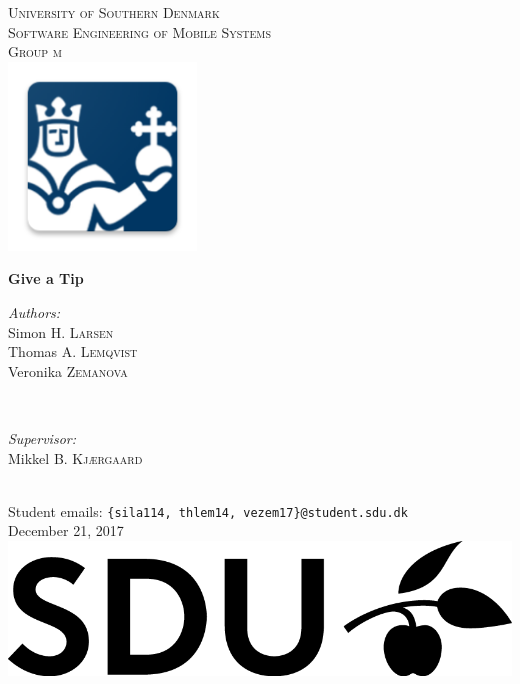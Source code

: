 \documentclass[12pt]{article}
\newcommand{\changeNumbering}[1]{
	\fancypagestyle{plain}{
		\renewcommand\headrulewidth{0pt}
		\fancyhf{}
		\fancyfoot[R]{\thepage\ of \pageref{#1}}
	}
	\fancyfoot[R]{\thepage\ of \pageref{#1}}
}
\begin{document}
\listoftodos

\begin{titlepage}

\newcommand{\HRule}{\rule{\linewidth}{0.5mm}} %

\center %
 

\textsc{\LARGE University of Southern Denmark}\\[1.5cm] %
\textsc{\Large Software Engineering of Mobile Systems}\\[0.5cm] %
\textsc{\large Group m}\\[0.5cm] %


\includegraphics[width=5cm]{images/ic_launcher}

{ \huge \bfseries Give a Tip}\\[0.7cm] 
 

\begin{minipage}[t]{0.4\textwidth}
\begin{flushleft} \large
\emph{Authors:}\\
Simon \textsc{H. Larsen}\\
Thomas \textsc{A. Lemqvist}\\
Veronika \textsc{Zemanova}\\
\end{flushleft}
\end{minipage}
~
\begin{minipage}[t]{0.4\textwidth}
\begin{flushright} \large
\emph{Supervisor:} \\
Mikkel \textsc{B. Kjærgaard}
\end{flushright}
\end{minipage}\\[2cm]
Student emails: \texttt{\{sila114, thlem14, vezem17\}@student.sdu.dk}\\[1.5em]
{\large December 21, 2017}\\[1.5cm] 

\includegraphics[width=.35\textwidth]{images/logo.png}\\[1cm]

\vfill 

\end{titlepage}
\changeNumbering{EndOfMainMatter}

\begin{abstract}

\end{abstract}

\vfill

\setcounter{tocdepth}{2}
\tableofcontents

\clearpage


\end{document}
